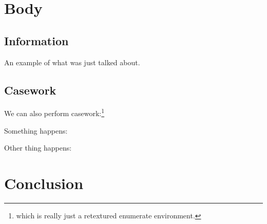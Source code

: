 \documentclass{article}
\begin{document}
\lipsum[4-4]

\section{Body}

\subsection{Information}
\lipsum[49-52]
\begin{example}
    An example of what was just talked about.
\end{example}

\subsection{Casework}
We can also perform casework:\footnote{which is really just a retextured enumerate environment.}
\begin{casework}
    \item Something happens: \lipsum[6-6]
    \item Other thing happens: \lipsum[5-5]
\end{casework}

\section{Conclusion}
\lipsum[7-7]
\end{document}
